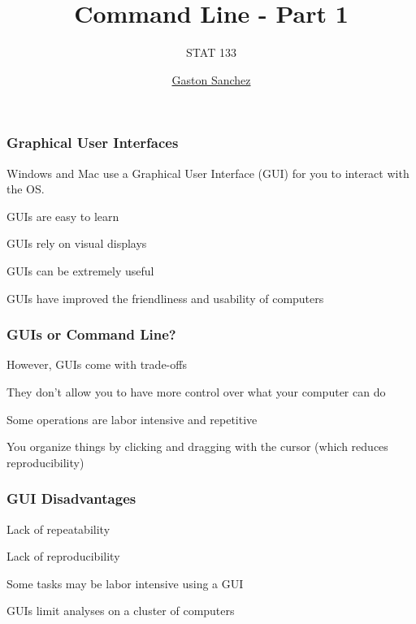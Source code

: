 \documentclass[12pt]{beamer}\usepackage[]{graphicx}\usepackage[]{color}
\title{Command Line - Part 1}
\subtitle{STAT 133}
\author{\href{http://www.gastonsanchez.com}{Gaston Sanchez}}
\institute{\href{https://github.com/ucb-stat133/stat133-fall-2016}{\tt \scriptsize \color{foreground} github.com/ucb-stat133/stat133-fall-2016}}
\date{}
\begin{document}
{
  \frame{
    \titlepage
  } 
}


\begin{frame}
\begin{center}
\Huge{}
\end{center}
\end{frame}


\begin{frame}
\frametitle{Graphical User Interfaces}

\bi
  \item Windows and Mac use a Graphical User Interface (GUI) for you to interact with the OS.
  \item GUIs are easy to learn
  \item GUIs rely on visual displays
  \item GUIs can be extremely useful
  \item GUIs have improved the friendliness and usability of computers
\ei

\end{frame}


\begin{frame}
\frametitle{GUIs or Command Line?}

\bi
  \item However, GUIs come with trade-offs
  \item They don't allow you to have more control over what your computer can do
  \item Some operations are labor intensive and repetitive
  \item You organize things by clicking and dragging with the cursor (which reduces reproducibility)
\ei

\end{frame}


\begin{frame}
\frametitle{GUI Disadvantages}
\bbi
  \item Lack of repeatability
  \item Lack of reproducibility
  \item Some tasks may be labor intensive using a GUI
  \item GUIs limit analyses on a cluster of computers
\ei
\end{frame}
\end{document}
